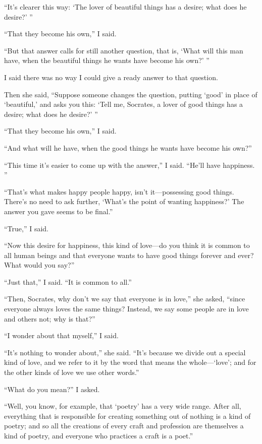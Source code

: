“It’s clearer this way: ‘The lover of beautiful things has a desire;
what does he desire?’ ”

“That they become his own,” I said.

“But that answer calls for still another question, that is, ‘What will
this man have, when the beautiful things he wants have become his own?’
”

I said there was no way I could give a ready answer to that question.

Then she said, “Suppose someone changes the question, putting ‘good’ in
place of ‘beautiful,’ and asks you this: ‘Tell me, Socrates, a lover of
good things has a desire; what does he desire?’ ”

“That they become his own,” I said.

“And what will he have, when the good things he wants have become his
own?”

“This time it’s easier to come up with the answer,” I said. “He’ll have
happiness.
”

“That’s what makes happy people happy, isn’t it---possessing good
things. There’s no need to ask further, ‘What’s the point of wanting
happiness?’ The answer you gave seems to be final.”

“True,” I said.

“Now this desire for happiness, this kind of love---do you think it is
common to all human beings and that everyone wants to have good things
forever and ever? What would you say?”

“Just that,” I said. “It is common to all.”

 “Then, Socrates, why don’t we say that everyone is in love,” she
asked, “since everyone always loves the same things? Instead, we say
some people are in love and others not; why is that?”

“I wonder about that myself,” I said.

“It’s nothing to wonder about,” she said. “It’s because we divide out a
special kind of love, and we refer to it by the word that means the
whole---‘love’; and for the other kinds of love we use other words.”

“What do you mean?” I asked.

“Well, you know, for example, that ‘poetry’ has a very wide
range. After all,
everything that is responsible for creating something out of 
nothing is a kind of poetry; and so all the creations of every craft and
profession are themselves a kind of poetry, and everyone who practices a
craft is a poet.”

